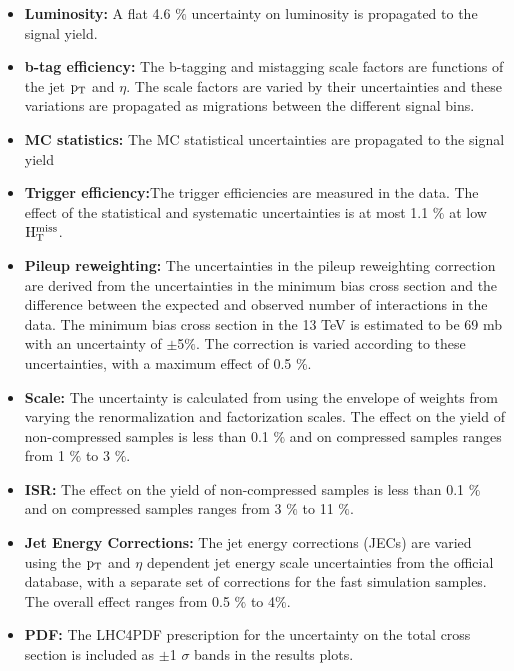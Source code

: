 \begin{itemize}

\item {\bf Luminosity:} A flat 4.6 $\%$ uncertainty on luminosity is propagated to the signal yield. 

\item {\bf b-tag efficiency:} The b-tagging and mistagging scale factors are functions of the jet
 $\rm p_{T}$ and $\eta$. The scale factors are varied by their uncertainties and these variations are propagated as migrations between the different signal bins.

\item {\bf MC statistics:} The MC statistical uncertainties are propagated to the signal yield 

\item {\bf Trigger efficiency:}The trigger efficiencies are measured in the data.
The effect of the statistical and systematic uncertainties is at most 1.1 $\%$ at low $\rm H_{T}^{miss}$.

\item {\bf Pileup reweighting: }The uncertainties in the pileup reweighting correction are derived from the uncertainties in the minimum bias cross section and the difference between the expected and  observed number of interactions in the data. The minimum bias cross section in the 13 TeV is estimated to be 69 mb with an uncertainty of $\pm$5$ \%$. The correction is varied according to these uncertainties, with a maximum effect of 0.5 $\%$.

\item {\bf Scale:} The uncertainty is calculated from using the envelope of weights from varying the renormalization and factorization scales. The effect on the yield of non-compressed samples is less than 0.1 $\%$ and on compressed samples ranges from 1 $ \%$ to 3 $ \%$.

\item {\bf ISR: } The effect on the yield of non-compressed samples is less than 0.1 $\%$ and on compressed samples ranges from 3 $\%$ to 11 $\%$.


\item {\bf Jet Energy Corrections: } The jet energy corrections (JECs) are varied using the $\rm p_{T}$
and $\eta$ dependent jet energy scale uncertainties from the official database, with a separate set of corrections for the fast simulation samples. The overall effect ranges from 0.5 $\%$ to 4$\%$. 

\item {\bf PDF: } The LHC4PDF prescription for the uncertainty on the total cross section is included as $\pm$1 $\sigma$ bands in the results plots. 

\end{itemize}
 



